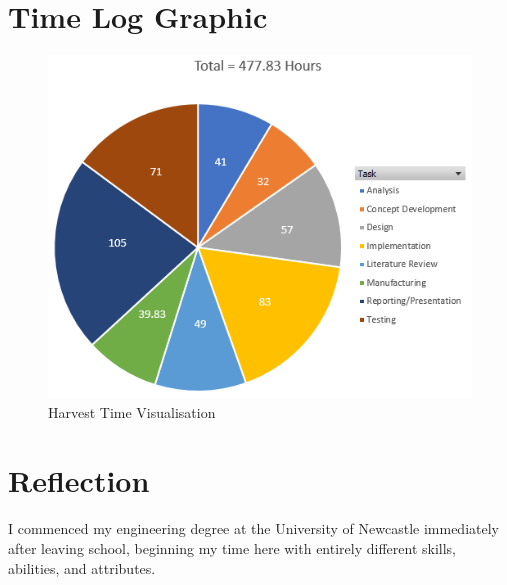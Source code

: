 \documentclass{UoNMCHA}
\numberwithin{equation}{section}
\begin{document}
\newpage
\appendix
\captionsetup[figure]{list=no}
\section{Time Log Graphic}
    \begin{figure}[H]
        \centering
        \includegraphics[keepaspectratio, width = \textwidth]{Figures/TimeLog.png}
        \caption{Harvest Time Visualisation}
    \end{figure}

\newpage
\section{Reflection}
    
    I commenced my engineering degree at the University of Newcastle immediately after leaving school, beginning my time here with entirely different skills, abilities, and attributes.
    
\end{document}
